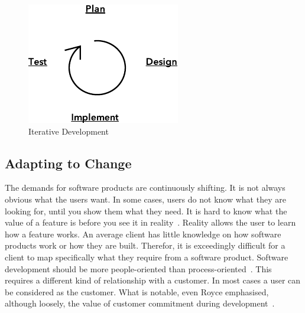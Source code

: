\documentclass[english]{tktltiki2}
\begin{document}
\begin{figure}[h!]

    \vspace{1cm}
    \centering

    \includegraphics{figures/iterative-development}

    \caption{Iterative Development}
    \label{figure:iterative-development}

\end{figure}

\subsection{Adapting to Change}

The demands for software products are continuously shifting. It is not always obvious what the users want. In some cases, users do not know what they are looking for, until you show them what they need. It is hard to know what the value of a feature is before you see it in reality~\cite{Fow05}. Reality allows the user to learn how a feature works. An average client has little knowledge on how software products work or how they are built. Therefor, it is exceedingly difficult for a client to map specifically what they require from a software product. Software development should be more people-oriented than process-oriented~\cite{Fow05}. This requires a different kind of relationship with a customer. In most cases a user can be considered as the customer. What is notable, even Royce emphasised, although loosely, the value of customer commitment during development~\cite{Roy70}.
\end{document}
